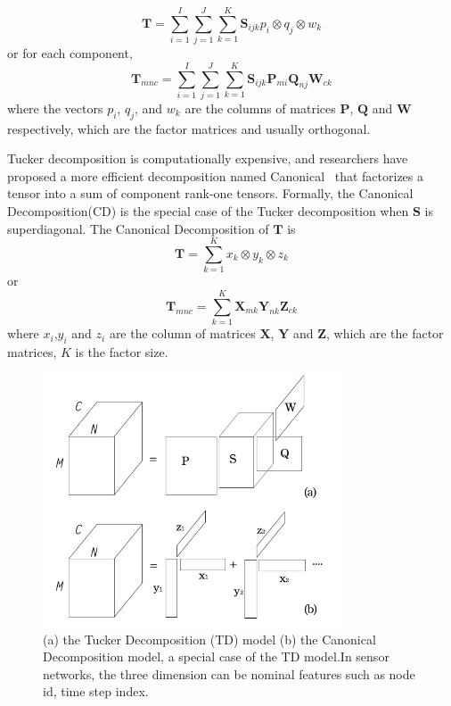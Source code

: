 \begin{equation*}
\mathbf{T}=\sum\limits_{i=1}^{I}\sum\limits_{j=1}^{J}\sum\limits_{k=1}^{K}\mathbf{S}_{ijk}p_i\otimes q_j\otimes w_k
\end{equation*}
or for each component,
\begin{equation*}
\mathbf{T}_{mnc}=\sum\limits_{i=1}^{I}\sum\limits_{j=1}^{J}\sum\limits_{k=1}^{K}\mathbf{S}_{ijk}\mathbf{P}_{m i}\mathbf{Q}_{n j}\mathbf{W}_{c k}
\end{equation*}
where the vectors $p_i$, $q_j$, and $w_k$ are the columns of matrices $\mathbf{P}$, $\mathbf{Q}$ and $\mathbf{W}$ respectively, which are the factor matrices and usually orthogonal.


Tucker decomposition is computationally expensive, and researchers have proposed a more efficient decomposition named Canonical ~\cite{carrol1970CD}that factorizes a tensor into a sum of component rank-one tensors.
Formally, the Canonical Decomposition(CD) is the special case of the Tucker decomposition when $\mathbf{S}$ is superdiagonal.
The Canonical Decomposition of $\mathbf{T}$ is
\begin{equation*}
\mathbf{T}=\sum\limits_{k=1}^{K}x_k\otimes y_k\otimes z_k
\end{equation*}
or
\begin{equation*}
\mathbf{T}_{mnc}=\sum\limits_{k=1}^{K}\mathbf{X}_{m k} \mathbf{Y}_{n k} \mathbf{Z}_{c k}
\end{equation*}
where $x_i$,$y_i$ and $z_i$ are the column of matrices $\mathbf{X}$, $\mathbf{Y}$ and $\mathbf{Z}$, which are the factor matrices, $K$ is the factor size. 

\begin{figure}[h] 
\includegraphics[width=9cm]{tf.jpg} 
\caption{ (a) the Tucker Decomposition (TD) model (b) the Canonical Decomposition model, a special case of the TD model.In sensor networks, the three dimension can be nominal features such as node id, time step index.} 
\label{fig:tf:tuckcanon} 
\end{figure}

